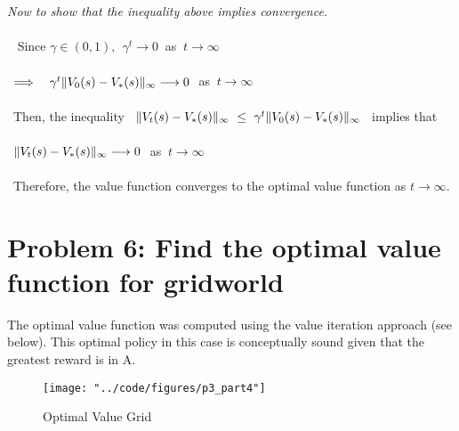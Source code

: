 \documentclass[twoside,11pt]{homework}
\DeclarePairedDelimiter{\2norm}{\lVert}{\rVert^2_2}
\newcommand{\1}[1]{\mathds{1}\left[#1\right]}
\DeclarePairedDelimiter{\infnorm}{\lVert}{\rVert_{\infty}}
\begin{document}
\noindent
\textit{Now to show that the inequality above implies convergence.}\\\ \\\
\noindent
Since $\gamma \in (0, 1), \ \ \gamma^t \longrightarrow 0 \ $ as $ \ t \longrightarrow \infty$\\\ \\\
$\Longrightarrow \ \ \ \gamma^t\infnorm{V_0(s) - V_*(s)} \longrightarrow 0 \ $ as $ \ t \longrightarrow \infty$\\\ \\\
Then, the inequality \ $\infnorm{V_t(s) - V_*(s)} \ \leq \ \gamma^t\infnorm{V_0(s) - V_*(s)}$ \  implies that \\\ \\\
$\infnorm{V_t(s) - V_*(s)} \longrightarrow 0 \ $ as $ \ t \longrightarrow \infty$\\\ \\\
Therefore, the value function converges to the optimal value function as $t \longrightarrow \infty$.

\section*{\large Problem 6: Find the optimal value function for gridworld}

The optimal value function was computed using the value iteration approach (see below). This optimal policy in this case is conceptually sound given that the greatest reward is in A.
\begin{figure}[H]
\centering
\caption{Optimal Value Grid}
\texttt{[image: "../code/figures/p3\_part4"]}
\label{fig:uniform-grid}
\end{figure}
\end{document}
